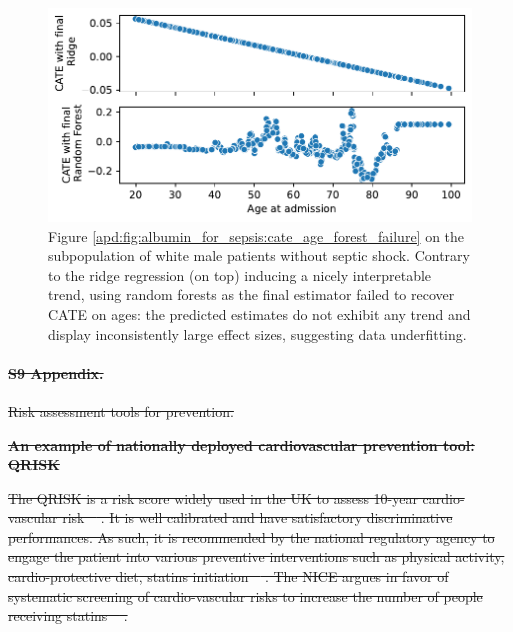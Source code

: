 \documentclass[10pt,letterpaper]{article}
\providecommand{\DIFdeltex}[1]{{\protect\color{red}\sout{#1}}}                      %
\providecommand{\DIFdelbegin}{} %
\providecommand{\DIFdelend}{} %
\providecommand{\DIFdel}[1]{\texorpdfstring{\DIFdeltex{#1}}{}} %
\newcommand{\DIFscaledelfig}{0.5}
\newlength{\DIFdelgraphicswidth} %
\newlength{\DIFdelgraphicsheight} %
\newcommand{\DIFdelincludegraphics}[2][]{%
\sbox{\DIFdelgraphicsbox}{\DIFOincludegraphics[#1]{#2}}%
\settoboxwidth{\DIFdelgraphicswidth}{\DIFdelgraphicsbox} %
\settoboxtotalheight{\DIFdelgraphicsheight}{\DIFdelgraphicsbox} %
\scalebox{\DIFscaledelfig}{%
\parbox[b]{\DIFdelgraphicswidth}{\usebox{\DIFdelgraphicsbox}\\[-\baselineskip] \rule{\DIFdelgraphicswidth}{0em}}\llap{\resizebox{\DIFdelgraphicswidth}{\DIFdelgraphicsheight}{%
\setlength{\unitlength}{\DIFdelgraphicswidth}%
\begin{picture}(1,1)%
\thicklines\linethickness{2pt} %
{\color[rgb]{1,0,0}\put(0,0){\framebox(1,1){}}}%
{\color[rgb]{1,0,0}\put(0,0){\line( 1,1){1}}}%
{\color[rgb]{1,0,0}\put(0,1){\line(1,-1){1}}}%
\end{picture}%
}\hspace*{3pt}}} %
} %
\DeclareRobustCommand{\DIFdelbegin}{\DIFOdelbegin \let\includegraphics\DIFdelincludegraphics} %
\DeclareRobustCommand{\DIFdelend}{\DIFOaddend \let\includegraphics\DIFOincludegraphics} %
\begin{document}
\begin{figure}
  \centering
  \includegraphics[width=\linewidth]{img_supp/cate_shock_random_forest.pdf}
  \caption{Figure \ref{apd:fig:albumin_for_sepsis:cate_age_forest_failure} on
    the subpopulation of white male patients without septic shock. Contrary to
    the ridge regression (on top) inducing a nicely interpretable trend, using
    random forests as the final estimator failed to recover CATE on ages: the
    predicted estimates do not exhibit any trend and display inconsistently
    large effect sizes, suggesting data underfitting.
  }\label{apd:fig:albumin_for_sepsis:cate_failure}
\end{figure}
\clearpage

\DIFdelbegin \paragraph*{\DIFdel{S9 Appendix.}}
\DIFdel{Risk assessment tools for prevention.}%

\textbf{\DIFdel{An example of nationally deployed cardiovascular prevention tool: QRISK}}

\DIFdel{The QRISK is a risk score widely used in the UK to assess 10-year
cardio-vascular risk \mbox{%
\cite{hippisley2017development}}\hskip0pt%
. It is well calibrated
and have satisfactory discriminative performances. As such, it is recommended
by the national regulatory agency to engage the patient into various
preventive interventions such as physical activity, cardio-protective diet,
statins initiation \mbox{%
\cite{guideline2023cardiovascular}}\hskip0pt%
. The NICE argues in favor
of systematic screening of cardio-vascular risks to increase the number of
people receiving statins \mbox{%
\cite{guideline2023cardiovascular}}\hskip0pt%
.
}\DIFdelend %
\end{document}
